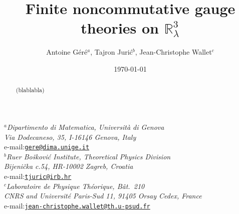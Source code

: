 \documentclass[a4paper,11pt,twoside]{article}
\makeatletter
\numberwithin{equation}{section}
\theoremstyle{nonumberplain}
\newcounter{and}
\newcommand{\institute}[1]{\newcommand{\@institute}{#1}}
\renewcommand{\maketitle}{
%
\vspace*{0.5\baselineskip}
%
{%
\center\LARGE\noindent\@title\par
}%
%
\vspace{1.5\baselineskip}
%
{%
\center\normalsize\noindent\ignorespaces\@author\par
}%
%
\vspace{0.5\baselineskip}
%
{%
\center\normalsize\ignorespaces\@institute\par
}%
%
\vspace{2\baselineskip}
%
}%
\makeatother
\begin{document}

\title{Finite noncommutative gauge theories on $\mathbb{R}^3_\lambda$}

\author{Antoine G\'er\'e$^a$, Tajron Juri\'c$^b$, Jean-Christophe Wallet$^c$}

\institute{%
%
\textit{$^a$Dipartimento di Matematica, Universit\`a di Genova\\
Via Dodecaneso, 35, I-16146 Genova, Italy}\\
e-mail:\href{mailto:gere@dima.unige.it}{\texttt{gere@dima.unige.it}}\\[1ex]%
%
\textit{$^b$Ru\dj er Bo\v{s}kovi\'c Institute, Theoretical Physics Division\\
Bijeni\v{c}ka c.54, HR-10002 Zagreb, Croatia}\\
e-mail:\href{mailto:tjuric@irb.hr}{\texttt{tjuric@irb.hr}}\\[1ex]%
%
\textit{$^c$Laboratoire de Physique Th\'eorique, B\^at.\ 210\\
CNRS and Universit\'e Paris-Sud 11,  91405 Orsay Cedex, France}\\
e-mail:\href{mailto:jean-christophe.wallet@th.u-psud.fr}{\texttt{jean-christophe.wallet@th.u-psud.fr}}\\[1ex]%
%
}%

\date{\today}

\maketitle


\begin{abstract} 
(blablabla)
\end{abstract}




\tableofcontents


\newpage
\end{document}
